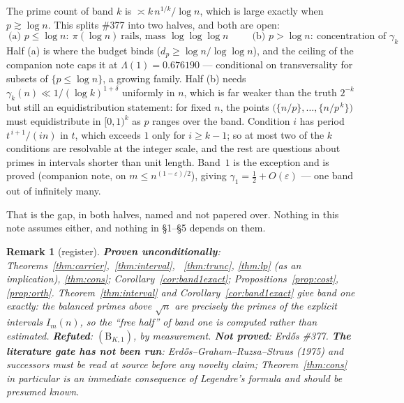 \documentclass[11pt]{article}
\newtheorem{remark}[theorem]{Remark}
\begin{document}
The prime count of band $k$ is $\asymp k\,n^{1/k}/\log n$, which is large
exactly when $p\gtrsim\log n$.  This splits \#377 into two halves, and both are
open:
\[
  \boxed{\ \text{(a) } p\le\log n:\ \pi(\log n)\ \text{rails, mass }\log\log\log n\ }
  \qquad
  \boxed{\ \text{(b) } p>\log n:\ \text{concentration of }\gamma_k\ }
\]
Half (a) is where the budget binds ($d_p\ge\log n/\log\log n$), and the ceiling
of the companion note caps it at $\Lambda(1)=0.676190$ --- conditional on
transversality for subsets of $\{p\le\log n\}$, a growing family.  Half (b)
needs $\gamma_k(n)\ll1/(\log k)^{1+\delta}$ uniformly in $n$, which is far
weaker than the truth $2^{-k}$ but still an equidistribution statement: for
fixed $n$, the points $\bigl(\{n/p\},\dots,\{n/p^{\,k}\}\bigr)$ must
equidistribute in $[0,1)^{k}$ as $p$ ranges over the band.  Condition $i$ has
period $t^{\,i+1}/(in)$ in $t$, which exceeds $1$ only for $i\ge k-1$; so at
most two of the $k$ conditions are resolvable at the integer scale, and the rest
are questions about primes in intervals shorter than unit length.  Band~$1$ is
the exception and is proved (companion note, on $m\le n^{(1-\varepsilon)/2}$),
giving $\gamma_1=\frac12+O(\varepsilon)$ --- one band out of infinitely many.

That is the gap, in both halves, named and not papered over.  Nothing in this
note assumes either, and nothing in \S1--\S5 depends on them.

\begin{remark}[register]
\textbf{Proven unconditionally}: Theorems~\ref{thm:carrier},~\ref{thm:interval},
~\ref{thm:trunc}, \ref{thm:lp} (as an implication), \ref{thm:cons};
Corollary~\ref{cor:band1exact}; Propositions~\ref{prop:cost}, \ref{prop:orth}.
Theorem~\ref{thm:interval} and Corollary~\ref{cor:band1exact} give band one exactly: the
balanced primes above $\sqrt n$ are precisely the primes of the explicit intervals
$I_m(n)$, so the ``free half'' of band one is computed rather than estimated.  \textbf{Refuted}: $(\mathrm B_{K,1})$, by measurement.
\textbf{Not proved}: Erd\H{o}s \#377.  \textbf{The literature gate has not been
run}: Erd\H{o}s--Graham--Ruzsa--Straus (1975) and successors must be read at
source before any novelty claim; Theorem~\ref{thm:cons} in particular is an
immediate consequence of Legendre's formula and should be presumed known.
\end{remark}
\end{document}
